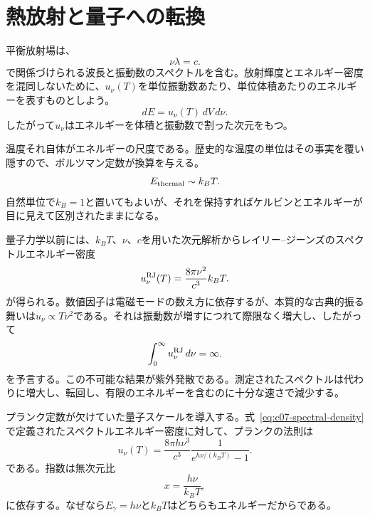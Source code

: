 \section{熱放射と量子への転換}

平衡放射場は、
\begin{equation}
\nu\lambda=c.
\end{equation}
で関係づけられる波長と振動数のスペクトルを含む。放射輝度とエネルギー密度を混同しないために、\(u_\nu(T)\)を単位振動数あたり、単位体積あたりのエネルギーを表すものとしよう。
\begin{equation}
dE=u_\nu(T)\,dV\,d\nu.
\label{eq:c07-spectral-density}
\end{equation}
したがって\(u_\nu\)はエネルギーを体積と振動数で割った次元をもつ。

温度それ自体がエネルギーの尺度である。歴史的な温度の単位はその事実を覆い隠すので、ボルツマン定数が換算を与える。
\begin{equation}
E_{\rm thermal}\sim k_B T.
\end{equation}
自然単位で\(k_B=1\)と置いてもよいが、それを保持すればケルビンとエネルギーが目に見えて区別されたままになる。

量子力学以前には、\(k_BT\)、\(\nu\)、\(c\)を用いた次元解析からレイリー--ジーンズのスペクトルエネルギー密度
\begin{equation}
u_\nu^{\rm RJ}(T)=\frac{8\pi\nu^2}{c^3}k_BT.
\label{eq:c07-rayleigh-jeans}
\end{equation}
が得られる。数値因子は電磁モードの数え方に依存するが、本質的な古典的振る舞いは\(u_\nu\propto T\nu^2\)である。それは振動数が増すにつれて際限なく増大し、したがって
\begin{equation}
\int_0^\infty u_\nu^{\rm RJ}\,d\nu=\infty.
\end{equation}
を予言する。この不可能な結果が紫外発散である。測定されたスペクトルは代わりに増大し、転回し、有限のエネルギーを含むのに十分な速さで減少する。

プランク定数が欠けていた量子スケールを導入する。式~\eqref{eq:c07-spectral-density}で定義されたスペクトルエネルギー密度に対して、プランクの法則は
\begin{equation}
u_\nu(T)
=
\frac{8\pi h\nu^3}{c^3}
\frac{1}{e^{h\nu/(k_BT)}-1}.
\label{eq:c07-planck}
\end{equation}
である。指数は無次元比
\begin{equation}
x=\frac{h\nu}{k_BT},
\end{equation}
に依存する。なぜなら\(E_\gamma=h\nu\)と\(k_BT\)はどちらもエネルギーだからである。

